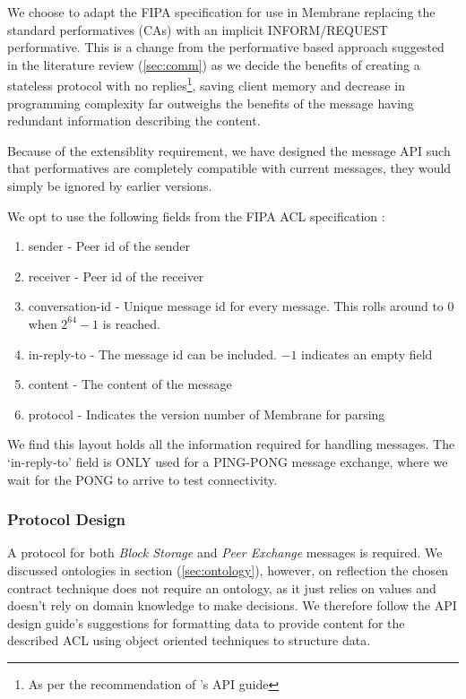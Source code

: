 \documentclass[11pt, a4paper, twocolumn, twoside]{report}
\begin{document}
We choose to adapt the FIPA specification for use in Membrane replacing the standard performatives (CAs) with an implicit INFORM/REQUEST performative. This is a change from the performative based approach suggested in the literature review (\ref{sec:comm}) as we decide the benefits of creating a stateless protocol with no replies\footnote{As per the recommendation of \citep{google2017api}'s API guide}, saving client memory and decrease in programming complexity far outweighs the benefits of the message having redundant information describing the content.

Because of the extensiblity requirement, we have designed the message API such that performatives are completely compatible with current messages, they would simply be ignored by earlier versions.

We opt to use the following fields from the FIPA ACL specification \citep{fipa2002fipa}:

\begin{enumerate}
 \item sender - Peer id of the sender
 \item receiver - Peer id of the receiver
 \item conversation-id - Unique message id for every message. This rolls around to $0$ when $2^{64}-1$ is reached.
 \item in-reply-to - The message id can be included. $-1$ indicates an empty field
 \item content - The content of the message
 \item protocol - Indicates the version number of Membrane for parsing
\end{enumerate}

We find this layout holds all the information required for handling messages. The `in-reply-to' field is ONLY used for a PING-PONG message exchange, where we wait for the PONG to arrive to test connectivity.

\subsubsection{Protocol Design}

A protocol for both \emph{Block Storage} and \emph{Peer Exchange} messages is required. We discussed ontologies in section (\ref{sec:ontology}), however, on reflection the chosen contract technique does not require an ontology, as it just relies on values and doesn't rely on domain knowledge to make decisions. We therefore follow the API design guide's suggestions for formatting data to provide content for the described ACL using object oriented techniques to structure data.
\end{document}
